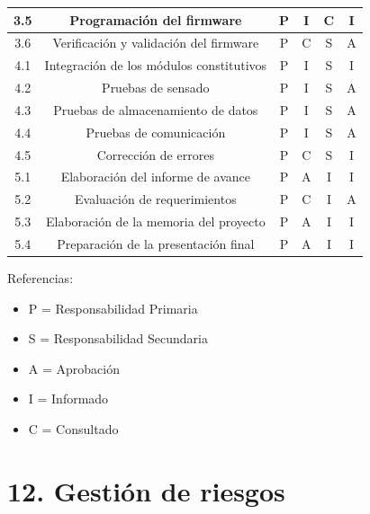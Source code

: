 \documentclass[11pt]{charter}
\begin{document}
\begin{table}[htpb]
{\begin{tabular}{|c|c|c|c|c|c|}
3.5 & Programación del firmware & P & I & C & I \\ \hline
3.6 & Verificación y validación del firmware & P & C & S & A \\ \hline
4.1 & Integración de los módulos constitutivos & P & I & S & I \\ \hline
4.2 & Pruebas de sensado & P & I & S & A \\ \hline
4.3 & Pruebas de almacenamiento de datos& P & I & S & A \\ \hline
4.4 & Pruebas de comunicación & P & I & S & A \\ \hline
4.5 & Corrección de errores & P & C & S & I \\ \hline
5.1 & Elaboración del informe de avance& P & A & I & I \\ \hline
5.2 & Evaluación de requerimientos & P & C & I & A \\ \hline
5.3 & Elaboración de la memoria del proyecto & P & A & I & I \\ \hline
5.4 & Preparación de la presentación final & P & A & I & I \\ \hline\end{tabular}%
}
\end{table}

{\footnotesize
Referencias:
\begin{itemize}
	\item P = Responsabilidad Primaria
	\item S = Responsabilidad Secundaria
	\item A = Aprobación
	\item I = Informado
	\item C = Consultado
\end{itemize}
} %


\section{12. Gestión de riesgos}
\label{sec:riesgos}
\end{document}
